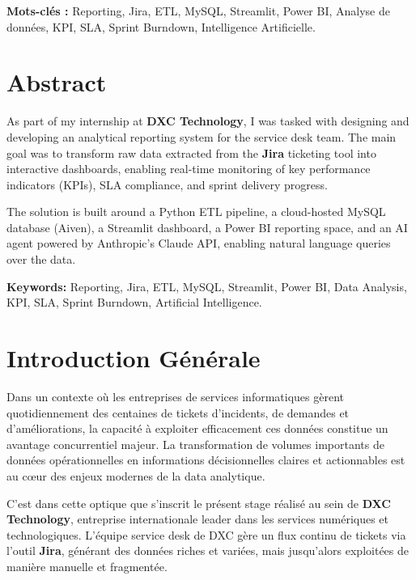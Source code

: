 \documentclass[12pt, a4paper]{report}
\begin{document}
\textbf{Mots-clés :} Reporting, Jira, ETL, MySQL, Streamlit, Power BI, Analyse de données, KPI, SLA, Sprint Burndown, Intelligence Artificielle.

\vspace{1cm}

\chapter*{Abstract}

As part of my internship at \textbf{DXC Technology}, I was tasked with designing and developing an analytical reporting system for the service desk team. The main goal was to transform raw data extracted from the \textbf{Jira} ticketing tool into interactive dashboards, enabling real-time monitoring of key performance indicators (KPIs), SLA compliance, and sprint delivery progress.

The solution is built around a Python ETL pipeline, a cloud-hosted MySQL database (Aiven), a Streamlit dashboard, a Power BI reporting space, and an AI agent powered by Anthropic's Claude API, enabling natural language queries over the data.

\textbf{Keywords:} Reporting, Jira, ETL, MySQL, Streamlit, Power BI, Data Analysis, KPI, SLA, Sprint Burndown, Artificial Intelligence.

\newpage

\tableofcontents
\newpage

\chapter*{Introduction Générale}

Dans un contexte où les entreprises de services informatiques gèrent quotidiennement des centaines de tickets d'incidents, de demandes et d'améliorations, la capacité à exploiter efficacement ces données constitue un avantage concurrentiel majeur. La transformation de volumes importants de données opérationnelles en informations décisionnelles claires et actionnables est au cœur des enjeux modernes de la data analytique.

C'est dans cette optique que s'inscrit le présent stage réalisé au sein de \textbf{DXC Technology}, entreprise internationale leader dans les services numériques et technologiques. L'équipe service desk de DXC gère un flux continu de tickets via l'outil \textbf{Jira}, générant des données riches et variées, mais jusqu'alors exploitées de manière manuelle et fragmentée.
\end{document}
